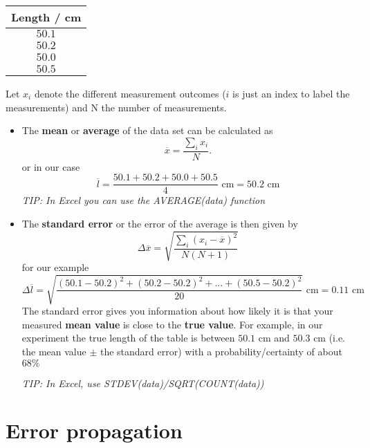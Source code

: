 \documentclass[a4paper,10pt]{article}
\begin{document}
\begin{center}
\begin{tabular}{|c|}
 \hline
 Length / cm \\
 \hline
 $50.1$  \\ 
 $50.2$  \\ 
 $50.0$  \\ 
 $50.5$  \\
 \hline
 
\end{tabular}
\end{center}
Let $x_i$ denote the different measurement outcomes ($i$ is just an index to label the measurements) and N the number of measurements.  
\begin{itemize} 
 \item The \textbf{mean} or \textbf{average} of the data set can be calculated as 
 \[ 
  \overline{x} = \frac{\sum_i x_i}{ N}.
 \]
 or in our case
 \[
   \overline{l} = \frac{50.1+50.2+50.0+50.5}{4} \text{ cm} = 50.2 \text{ cm}
 \]
 \textit{TIP: In Excel you can use the AVERAGE(data) function}
 \item The \textbf{standard error} or the error of the average is then given by
 \[
  \Delta \overline{x} = \sqrt{ \frac{\sum_i (x_i - \overline{x})^2}{N(N+1)}}
 \]
 for our example
 \[
  \Delta \overline{l} = \sqrt{\frac{(50.1-50.2)^2 + (50.2 - 50.2)^2 + ... + (50.5-50.2)^2}{20}} \text{ cm} = 0.11 \text{ cm}
 \]
 The standard error gives you information about how likely it is that your measured \textbf{mean value} is close to the \textbf{true value}. 
 For example, in our experiment the true length of the table is between $50.1$ cm and $50.3$ cm (i.e. the mean value $\pm$ the standard error)
 with a probability/certainty of about $68 \%$

 \textit{TIP: In Excel, use STDEV(data)/SQRT(COUNT(data))}
\end{itemize}

\section{Error propagation}
\end{document}
